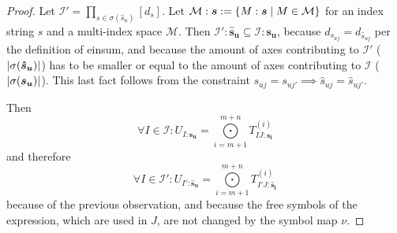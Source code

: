 \begin{proof}
    Let $\mathcal{I}' = \prod_{s \in \sigma(\hat{s}_u)} [d_s]$.
    Let $\mathcal{M}:\bm{s} := \lbrace M: \bm{s} \mid M \in \mathcal{M} \rbrace$ for an index string $s$ and a multi-index space $\mathcal{M}$.
    Then $\mathcal{I}':\bm{\hat{s}_u} \subseteq \mathcal{I}:\bm{s_u}$, because $d_{s_{uj}} = d_{\hat{s}_{uj}}$ per the definition of einsum,
    and because the amount of axes contributing to $\mathcal{I}'$ ($\left| \sigma(\bm{\hat{s}_u}) \right|$) has to be smaller or equal to the amount of axes contributing to $\mathcal{I}$ ($\left| \sigma(\bm{s_u}) \right|$).
    This last fact follows from the constraint $s_{uj} = s_{uj'} \implies \hat{s}_{uj} = \hat{s}_{uj'}$.

    Then
    $$\forall I \in \mathcal{I}: U_{I: \bm{s_u}} = \bigodot\limits_{i = m + 1}^{m + n} T^{(i)}_{IJ:\bm{s_{i}}}$$
    and therefore
    $$\forall I \in \mathcal{I}': U_{I': \bm{\hat{s}_u}} = \bigodot\limits_{i = m + 1}^{m + n} T^{(i)}_{I'J:\bm{\hat{s}_{i}}}$$
    because of the previous observation,
    and because the free symbols of the expression, which are used in $J$, are not changed by the symbol map $\nu$.


\end{proof}
